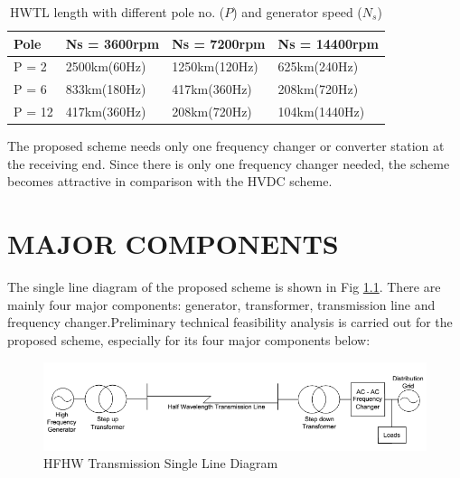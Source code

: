 \documentclass[12pt,a4paper]{reportmod}
\begin{document}
\begin{table}[h]
\label{tab:pns}
\begin{tabu} to \textwidth {|X[c]|X[c]|X[c]|X[c]|}
\hline
Pole & Ns = 3600rpm & Ns = 7200rpm & Ns = 14400rpm\\
\hline
P = 2 & 2500km(60Hz) & 1250km(120Hz) & 625km(240Hz)\\
P = 6 & 833km(180Hz) & 417km(360Hz) & 208km(720Hz)\\
P = 12 & 417km(360Hz) & 208km(720Hz) & 104km(1440Hz)\\
\hline
\end{tabu}
\caption{HWTL length with different pole no. ($P$) and generator speed ($N_s$)}
\end{table}
\par The proposed scheme needs only one frequency changer or converter station at the receiving end. Since there is only one frequency changer needed, the scheme becomes attractive in comparison with the HVDC scheme.
\chapter{MAJOR COMPONENTS}
\par The single line diagram of the proposed scheme is shown in Fig \ref{fig:sld}. There are mainly four major components: generator, transformer, transmission line and frequency changer.Preliminary technical feasibility analysis is carried out for the proposed scheme, especially for its four major components below:
\begin{figure}[h]
\label{fig:sld}
\begin{center}
\includegraphics[scale=0.5]{SingleLineDiagram.png}
\caption{HFHW Transmission Single Line Diagram}
\end{center}
\end{figure}
\end{document}
